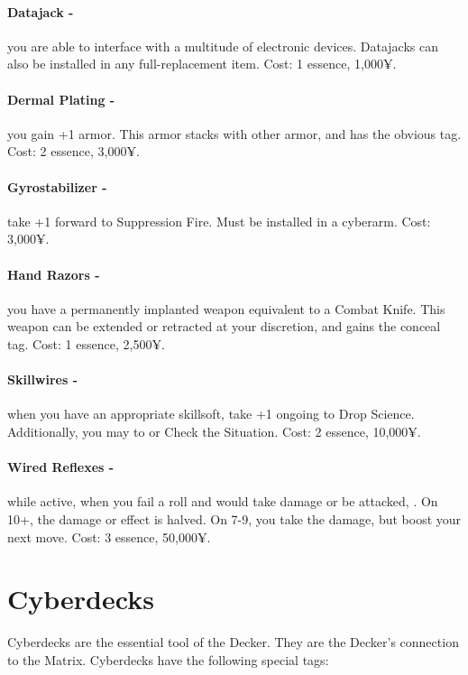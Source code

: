 \paragraph{Datajack -} you are able to interface with a multitude of electronic devices. Datajacks can also be installed in any full-replacement item. Cost: 1 essence, 1,000¥.

\paragraph{Dermal Plating -} you gain +1 armor. This armor stacks with other armor, and has the obvious tag. Cost: 2 essence, 3,000¥.

\paragraph{Gyrostabilizer -} take +1 forward to Suppression Fire. Must be installed in a cyberarm. Cost: 3,000¥.

\paragraph{Hand Razors -} you have a permanently implanted weapon equivalent to a Combat Knife. This weapon can be extended or retracted at your discretion, and gains the conceal tag. Cost: 1 essence, 2,500¥.

\paragraph{Skillwires -} \label{skillwires} when you have an appropriate skillsoft, take +1 ongoing to Drop Science. Additionally, you may  to  or Check the Situation. Cost: 2 essence, 10,000¥.

\paragraph{Wired Reflexes -} while active, when you fail a roll and would take damage or be attacked, . On 10+, the damage or effect is halved. On 7-9, you take the damage, but boost your next move. Cost: 3 essence, 50,000¥.



\section{Cyberdecks}

Cyberdecks are the essential tool of the Decker. They are the Decker’s connection to the Matrix. Cyberdecks have the following special tags:

